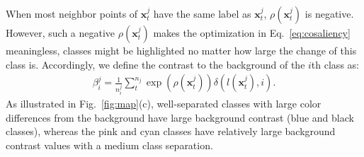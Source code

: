 When most neighbor points of $\mathbf{x}^j_t$ have the same label as $\mathbf{x}^j_t$,  $\rho (\mathbf{x}^j_t)$ is negative.
However, such a negative $\rho (\mathbf{x}^j_t)$ makes the optimization in Eq.~\ref{eq:cosaliency} meaningless,  classes might be highlighted no matter how large the change of this class is.
 Accordingly, we define
the contrast to the background of the $i$th class as:
\begin{align}\label{eq:ctbc}
 \beta^j_i = \frac{1}{n^j_i}\sum^{n_j}_{t} \exp(\rho(\mathbf{x}^j_t)) \delta(l(\mathbf{x}^j_t),i).
\end{align}
As illustrated in Fig.~\ref{fig:map}(c), well-separated classes with large color differences from the background have large background contrast (blue and black classes), whereas the pink and cyan classes have relatively large background contrast values with a medium class separation.



